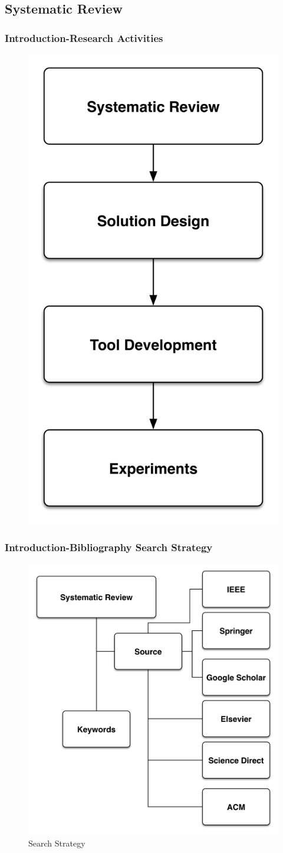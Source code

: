 \documentclass{beamer}
\begin{document}
\subsection{Systematic Review}
\begin{frame}
\frametitle{Introduction-Research Activities}
\begin{figure}[H]
\centering
\includegraphics[width=0.4\linewidth]{schedule.PNG}
\end{figure}
\end{frame}




\begin{frame}
\frametitle{Introduction-Bibliography Search Strategy}
\begin{figure}[H]
\centering
\includegraphics[width=0.5\linewidth]{StateofArt.PNG}
\caption{Search Strategy}
\end{figure}
\end{frame}
\end{document}
